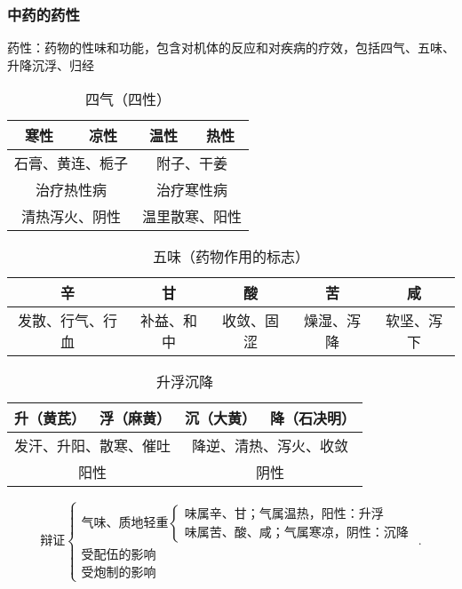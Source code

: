 \subsubsection*{中药的药性}%
\label{subsub:中药的药性}
\begin{defi}
    药性：药物的性味和功能，包含对机体的反应和对疾病的疗效，包括四气、五味、升降沉浮、归经
\end{defi}
\begin{table}[htpb]
    \centering
    \caption{四气（四性）}
    \label{tab:四气（四性）}
    \begin{tabular}{cccc}
    \toprule
    寒性 & 凉性 & 温性 & 热性\\
    \midrule
    \multicolumn{2}{c}{石膏、黄连、栀子} & \multicolumn{2}{c}{附子、干姜}\\
    \midrule
    \multicolumn{2}{c}{治疗热性病} & \multicolumn{2}{c}{治疗寒性病}\\
    \multicolumn{2}{c}{清热泻火、阴性} & \multicolumn{2}{c}{温里散寒、阳性}\\
    \bottomrule
    \end{tabular}
\end{table}
\begin{table}[htpb]
    \centering
    \caption{五味（药物作用的标志）}
    \label{tab:五味-药物作用的标志-}
    \begin{tabular}{ccccc}
    \toprule
    辛 & 甘 & 酸 & 苦 & 咸\\
    \midrule
    发散、行气、行血 & 补益、和中 & 收敛、固涩 & 燥湿、泻降 & 软坚、泻下\\
    \bottomrule
    \end{tabular}
\end{table}
\begin{table}[htpb]
    \centering
    \caption{升浮沉降}
    \label{tab:升浮沉降}
    \begin{tabular}{cccc}
    \toprule
    升（黄芪）& 浮（麻黄） & 沉（大黄）& 降（石决明）\\
    \midrule
    \multicolumn{2}{c}{发汗、升阳、散寒、催吐} & \multicolumn{2}{c}{降逆、清热、泻火、收敛}\\
    \midrule
    \multicolumn{2}{c}{阳性} & \multicolumn{2}{c}{阴性}\\
    \bottomrule
    \end{tabular}
\end{table}
\[
    \mbox{辩证}
    \begin{cases}
        \mbox{气味、质地轻重}
        \begin{cases}
            \mbox{味属辛、甘；气属温热，阳性：升浮}\\ 
            \mbox{味属苦、酸、咸；气属寒凉，阴性：沉降}
        \end{cases}\\ 
        \mbox{受配伍的影响}\\ 
        \mbox{受炮制的影响}
    \end{cases}
.\]

